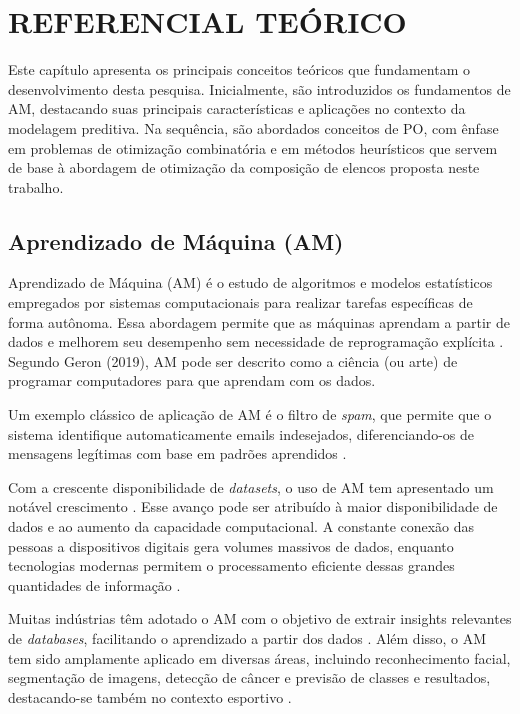 \chapter{REFERENCIAL TEÓRICO}

Este capítulo apresenta os principais conceitos teóricos que fundamentam o desenvolvimento desta pesquisa. 
Inicialmente, são introduzidos os fundamentos de AM, destacando suas principais características e aplicações no contexto da modelagem preditiva. 
Na sequência, são abordados conceitos de PO, com ênfase em problemas de otimização combinatória e em métodos heurísticos que servem de base à 
abordagem de otimização da composição de elencos proposta neste trabalho.

\section{Aprendizado de Máquina (AM)}

Aprendizado de Máquina (AM) é o estudo de algoritmos e modelos estatísticos empregados por sistemas computacionais para realizar tarefas específicas de forma autônoma. 
Essa abordagem permite que as máquinas aprendam a partir de dados e melhorem seu desempenho sem necessidade de reprogramação explícita \cite{Mahesh2020}. 
Segundo Geron (2019), AM pode ser descrito como a ciência (ou arte) de programar computadores para que aprendam com os dados.

Um exemplo clássico de aplicação de AM é o filtro de \textit{spam}, que permite que o sistema identifique automaticamente emails indesejados, 
diferenciando-os de mensagens legítimas com base em padrões aprendidos \cite{Geron2019}. 

Com a crescente disponibilidade de \textit{datasets}, o uso de AM tem apresentado um notável crescimento \cite{Mahesh2020}. 
Esse avanço pode ser atribuído à maior disponibilidade de dados e ao aumento da capacidade computacional. 
A constante conexão das pessoas a dispositivos digitais gera volumes massivos de dados, enquanto tecnologias modernas permitem o 
processamento eficiente dessas grandes quantidades de informação \cite{Jordan2015}.

Muitas indústrias têm adotado o AM com o objetivo de extrair insights relevantes de \textit{databases}, facilitando o aprendizado a partir dos dados \cite{Mahesh2020}. 
Além disso, o AM tem sido amplamente aplicado em diversas áreas, incluindo reconhecimento facial, segmentação de imagens, detecção de câncer e previsão de classes 
e resultados, destacando-se também no contexto esportivo \cite{Almulla2023}.

